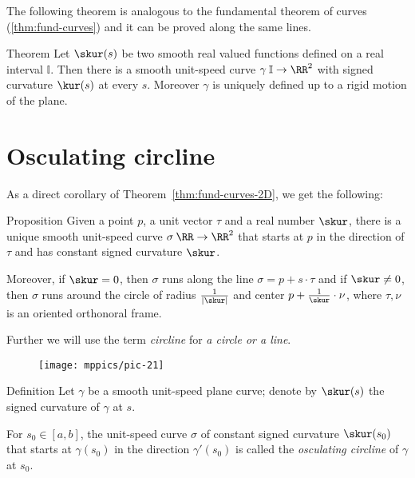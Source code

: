 The following theorem is analogous to the fundamental theorem of curves (\ref{thm:fund-curves}) and it can be proved along the same lines.

\begin{thm}{Theorem}\label{thm:fund-curves-2D}
Let $\skur(s)$ be two smooth real valued functions defined on a real interval $\mathbb{I}$.
Then there is a smooth unit-speed curve $\gamma\:\mathbb{I}\to\RR^2$ with signed curvature $\kur(s)$ at every $s$.
Moreover $\gamma$ is uniquely defined up to a rigid motion of the plane.
\end{thm}

\section*{Osculating circline}

As a direct corollary of Theorem~\ref{thm:fund-curves-2D}, we get the following:

\begin{thm}{Proposition}\label{prop:circline}
Given a point $p$,
a unit vector $\tau$ 
and a real number $\skur$, there is a unique smooth unit-speed curve $\sigma\:\RR\to\RR^2$ 
that starts at $p$ in the direction of $\tau$ and has constant signed curvature $\skur$.

Moreover, if $\skur=0$, then $\sigma$ runs along the line $\sigma=p+s\cdot \tau$
and if $\skur\ne 0$, then $\sigma$ runs around the circle of radius $\tfrac1{|\skur|}$ and center $p+\tfrac1\skur\cdot \nu$, where $\tau,\nu$ is an oriented orthonoral frame.
\end{thm}

Further we will use the term \emph{circline} for \emph{a circle or a line}.

{

\begin{wrapfigure}{r}{30 mm}
\vskip-0mm
\centering
\texttt{[image: mppics/pic-21]}
\vskip0mm
\end{wrapfigure}

\begin{thm}{Definition}
Let $\gamma$ be a smooth unit-speed plane curve;
denote by $\skur(s)$ the signed curvature of $\gamma$ at $s$.

For $s_0 \in [a,b]$, the unit-speed curve $\sigma$ of constant signed curvature $\skur(s_0)$ that starts at $\gamma(s_0)$ in the direction $\gamma'(s_0)$ is called the \emph{osculating circline} of $\gamma$ at $s_0$.
\end{thm}

}

